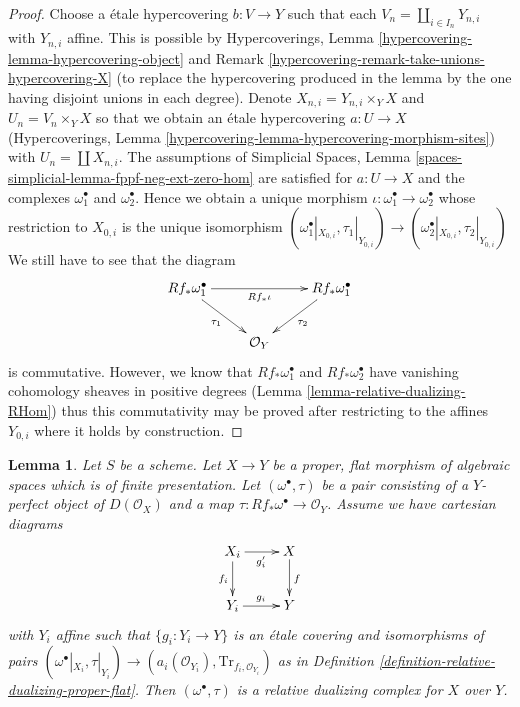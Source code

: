 \documentclass{stacks-project}
\theoremstyle{plain}
\newtheorem{lemma}[subsection]{Lemma}
\theoremstyle{definition}
\theoremstyle{remark}
\numberwithin{equation}{subsection}
\begin{document}
\begin{proof}
\medskip\noindent
Choose a \'etale hypercovering $b : V \to Y$ such that each
$V_n = \coprod_{i \in I_n} Y_{n, i}$ with $Y_{n, i}$ affine.
This is possible by Hypercoverings, Lemma
\ref{hypercovering-lemma-hypercovering-object} and
Remark \ref{hypercovering-remark-take-unions-hypercovering-X}
(to replace the hypercovering produced
in the lemma by the one having disjoint unions in each degree).
Denote $X_{n, i} = Y_{n, i} \times_Y X$ and $U_n = V_n \times_Y X$
so that we obtain an \'etale hypercovering
$a : U \to X$ (Hypercoverings, Lemma
\ref{hypercovering-lemma-hypercovering-morphism-sites})
with $U_n = \coprod X_{n, i}$.
The assumptions of Simplicial Spaces, Lemma
\ref{spaces-simplicial-lemma-fppf-neg-ext-zero-hom}
are satisfied for $a : U \to X$ and the complexes
$\omega_1^\bullet$ and $\omega_2^\bullet$.
Hence we obtain a unique morphism
$\iota : \omega_1^\bullet \to \omega_2^\bullet$
whose restriction to $X_{0, i}$ is the unique
isomorphism $(\omega_1^\bullet|_{X_{0, i}}, \tau_1|_{Y_{0, i}}) \to
(\omega_2^\bullet|_{X_{0, i}}, \tau_2|_{Y_{0, i}})$
We still have to see that the diagram
$$
\xymatrix{
Rf_*\omega_1^\bullet \ar[rd]_{\tau_1} \ar[rr]_{Rf_*\iota} & &
Rf_*\omega_1^\bullet \ar[ld]^{\tau_2} \\
& \mathcal{O}_Y
}
$$
is commutative. However, we know that $Rf_*\omega_1^\bullet$ and
$Rf_*\omega_2^\bullet$ have vanishing cohomology sheaves in positive
degrees (Lemma \ref{lemma-relative-dualizing-RHom})
thus this commutativity may be proved after
restricting to the affines $Y_{0, i}$ where it holds by construction.
\end{proof}

\begin{lemma}
\label{lemma-covering-enough}
Let $S$ be a scheme. Let $X \to Y$ be a proper, flat morphism of
algebraic spaces which is of finite presentation.
Let $(\omega^\bullet, \tau)$ be a pair consisting
of a $Y$-perfect object of $D(\mathcal{O}_X)$ and a map
$\tau : Rf_*\omega^\bullet \to \mathcal{O}_Y$.
Assume we have cartesian diagrams
$$
\xymatrix{
X_i \ar[r]_{g_i'} \ar[d]_{f_i} & X \ar[d]^f \\
Y_i \ar[r]^{g_i} & Y
}
$$
with $Y_i$ affine such that $\{g_i : Y_i \to Y\}$ is an \'etale covering
and isomorphisms of pairs $(\omega^\bullet|_{X_i}, \tau|_{Y_i})
\to (a_i(\mathcal{O}_{Y_i}), \text{Tr}_{f_i, \mathcal{O}_{Y_i}})$
as in Definition \ref{definition-relative-dualizing-proper-flat}.
Then $(\omega^\bullet, \tau)$ is a relative dualizing complex for $X$ over $Y$.
\end{lemma}
\end{document}
